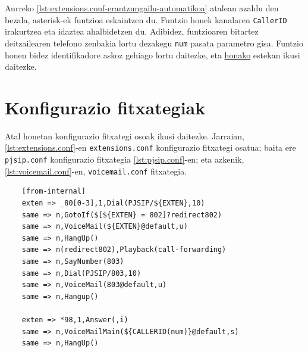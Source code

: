 Aurreko \autoref{lst:extensions.conf-erantzungailu-automatikoa} atalean azaldu den bezala, asterisk-ek funtzioa eskaintzen du. Funtzio honek kanalaren \texttt{CallerID} irakurtzea eta idaztea ahalbidetzen du. Adibidez, funtzioaren bitartez deitzailearen telefono zenbakia lortu dezakegu \texttt{num} pasata parametro gisa. Funtzio honen bidez identifikadore askoz gehiago lortu daitezke, eta \href{https://docs.asterisk.org/Asterisk_20_Documentation/API_Documentation/Dialplan_Functions/CALLERID/}{honako} estekan ikusi daitezke. 
    
\section{Konfigurazio fitxategiak}
\label{sec:konfigurazio-fitxategiak}

Atal honetan konfigurazio fitxategi osoak ikusi daitezke. Jarraian, \autoref{lst:extensions.conf}-en \texttt{extensions.conf} konfigurazio fitxategi osatua; baita ere \texttt{pjsip.conf} konfigurazio fitxategia \autoref{lst:pjsip.conf}-en; eta azkenik,  \autoref{lst:voicemail.conf}-en, \texttt{voicemail.conf} fitxategia.

\begin{listing}
    \begin{verbatim}
    [from-internal]
    exten => _80[0-3],1,Dial(PJSIP/${EXTEN},10)
    same => n,GotoIf($[${EXTEN} = 802]?redirect802)
    same => n,VoiceMail(${EXTEN}@default,u)
    same => n,HangUp()
    same => n(redirect802),Playback(call-forwarding)
    same => n,SayNumber(803)
    same => n,Dial(PJSIP/803,10)
    same => n,VoiceMail(803@default,u)
    same => n,Hangup()
    
    exten => *98,1,Answer(,i)
    same => n,VoiceMailMain(${CALLERID(num)}@default,s)
    same => n,HangUp()
    \end{verbatim}
    \caption{/etc/asterisk/extensions.conf konfigurazio fitxategia}
    \label{lst:extensions.conf}
\end{listing}

